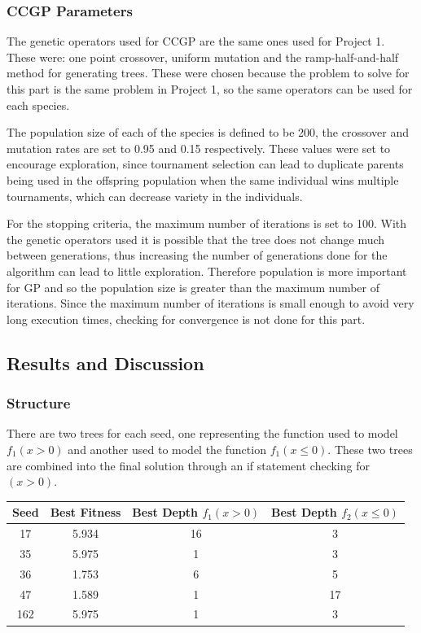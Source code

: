 \documentclass{article}
\begin{document}
\subsubsection*{CCGP Parameters}
The genetic operators used for CCGP are the same ones used for Project 1. These were: one point crossover, uniform mutation and the ramp-half-and-half method for generating trees. These were chosen because the problem to solve for this part is the same problem in Project 1, so the same operators can be used for each species. \par
\noindent The population size of each of the species is defined to be 200, the crossover and mutation rates are set to 0.95 and 0.15 respectively. These values were set to encourage exploration, since tournament selection can lead to duplicate parents being used in the offspring population when the same individual wins multiple tournaments, which can decrease variety in the individuals.   \par
\noindent For the stopping criteria, the maximum number of iterations is set to 100. 
With the genetic operators used it is possible that the tree does not change much between generations, thus increasing the number of generations done for the algorithm can lead to little exploration. 
Therefore population is more important for GP and so the population size is greater than the maximum number of iterations. Since the maximum number of iterations is small enough to avoid very long execution times, checking for convergence is not done for this part. \par
\subsection*{Results and Discussion}
\subsubsection*{Structure}
There are two trees for each seed, one representing the function used to model $f_1(x > 0)$ and another used to model the function $f_1(x \le 0)$. These two trees are combined into the final solution through an if statement checking for $(x > 0)$. \par

\begin{center}
	\begin{tabular}{|c|c|c|c|}
		\hline
		Seed & Best Fitness & Best Depth $f_1(x > 0)$ & Best Depth $f_2(x \le 0)$ \\
		\hline
		17 & 5.934 & 16 & 3 \\
		\hline
		35 & 5.975 & 1 & 3 \\
		\hline
		36 & 1.753 & 6 & 5 \\
		\hline
		47 & 1.589 & 1 & 17 \\
		\hline
		162 & 5.975 & 1 & 3 \\
		\hline
	\end{tabular}
\end{center}
\end{document}
